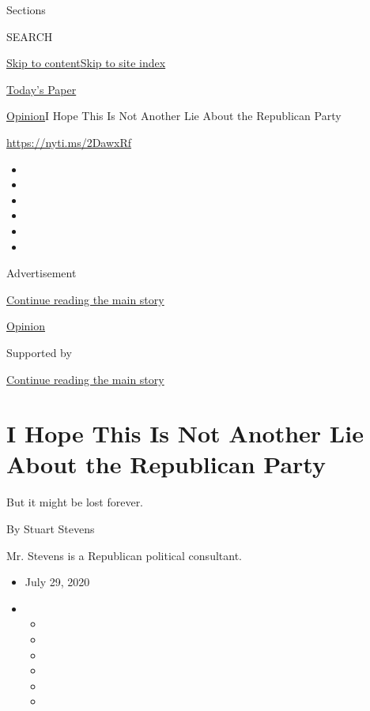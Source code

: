 Sections

SEARCH

\protect\hyperlink{site-content}{Skip to
content}\protect\hyperlink{site-index}{Skip to site index}

\href{https://myaccount.nytimes.com/auth/login?response_type=cookie\&client_id=vi}{}

\href{https://www.nytimes.com/section/todayspaper}{Today's Paper}

\href{/section/opinion}{Opinion}\textbar{}I Hope This Is Not Another Lie
About the Republican Party

\href{https://nyti.ms/2DawxRf}{https://nyti.ms/2DawxRf}

\begin{itemize}
\item
\item
\item
\item
\item
\item
\end{itemize}

Advertisement

\protect\hyperlink{after-top}{Continue reading the main story}

\href{/section/opinion}{Opinion}

Supported by

\protect\hyperlink{after-sponsor}{Continue reading the main story}

\hypertarget{i-hope-this-is-not-another-lie-about-the-republican-party}{%
\section{I Hope This Is Not Another Lie About the Republican
Party}\label{i-hope-this-is-not-another-lie-about-the-republican-party}}

But it might be lost forever.

By Stuart Stevens

Mr. Stevens is a Republican political consultant.

\begin{itemize}
\item
  July 29, 2020
\item
  \begin{itemize}
  \item
  \item
  \item
  \item
  \item
  \item
  \end{itemize}
\end{itemize}


